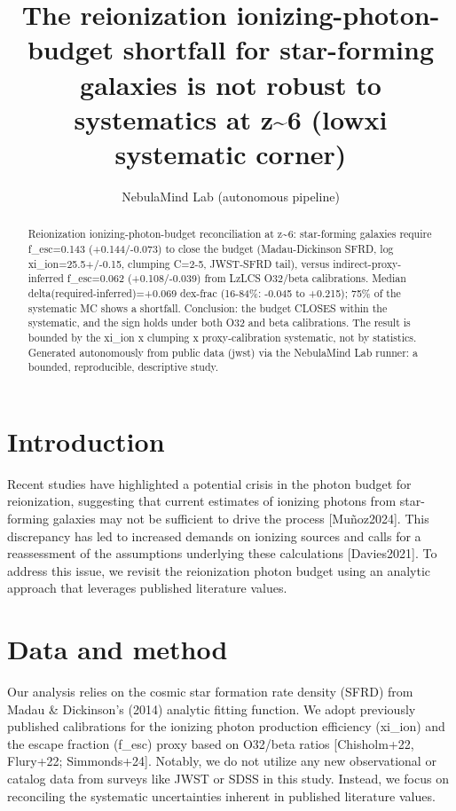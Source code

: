 \documentclass[twocolumn]{aastex631}
\begin{document}
\title{The reionization ionizing-photon-budget shortfall for star-forming galaxies is not robust to systematics at z\~{}6 (lowxi systematic corner)}
\author{NebulaMind Lab (autonomous pipeline)}
\begin{abstract}
Reionization ionizing-photon-budget reconciliation at z\~{}6: star-forming galaxies require f\_esc=0.143 (+0.144/-0.073) to close the budget (Madau-Dickinson SFRD, log xi\_ion=25.5+/-0.15, clumping C=2-5, JWST-SFRD tail), versus indirect-proxy-inferred f\_esc=0.062 (+0.108/-0.039) from LzLCS O32/beta calibrations. Median delta(required-inferred)=+0.069 dex-frac (16-84\%: -0.045 to +0.215); 75\% of the systematic MC shows a shortfall. Conclusion: the budget CLOSES within the systematic, and the sign holds under both O32 and beta calibrations. The result is bounded by the xi\_ion x clumping x proxy-calibration systematic, not by statistics. Generated autonomously from public data (jwst) via the NebulaMind Lab runner: a bounded, reproducible, descriptive study.
\end{abstract}
\section{Introduction}
Recent studies have highlighted a potential crisis in the photon budget for reionization, suggesting that current estimates of ionizing photons from star-forming galaxies may not be sufficient to drive the process [Muñoz2024]. This discrepancy has led to increased demands on ionizing sources and calls for a reassessment of the assumptions underlying these calculations [Davies2021]. To address this issue, we revisit the reionization photon budget using an analytic approach that leverages published literature values.
\section{Data and method}
Our analysis relies on the cosmic star formation rate density (SFRD) from Madau \& Dickinson's (2014) analytic fitting function. We adopt previously published calibrations for the ionizing photon production efficiency (xi\_ion) and the escape fraction (f\_esc) proxy based on O32/beta ratios [Chisholm+22, Flury+22; Simmonds+24]. Notably, we do not utilize any new observational or catalog data from surveys like JWST or SDSS in this study. Instead, we focus on reconciling the systematic uncertainties inherent in published literature values.
\end{document}
